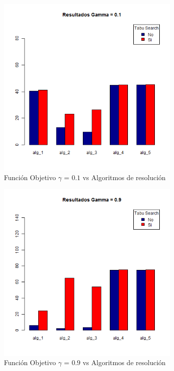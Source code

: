 \begin{figure}[H]
  \centering
    \includegraphics[width=0.8\textwidth]{resultados/affiliations/Graficos_agrupados/gamma01-affiliations.png}
  \caption{Función Objetivo $\gamma$ = $0.1$ vs Algoritmos de resolución}
  \label{res:img-affiliations-agr-gamma01}
\end{figure}

\begin{figure}[H]
  \centering
    \includegraphics[width=0.8\textwidth]{resultados/affiliations/Graficos_agrupados/gamma09-affiliations.png}
  \caption{Función Objetivo $\gamma$ = $0.9$ vs Algoritmos de resolución}
  \label{res:img-affiliations-agr-gamma09}
\end{figure}


